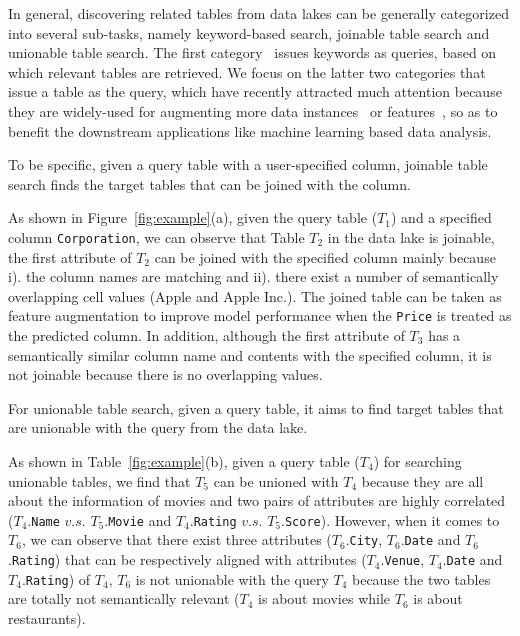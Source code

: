 In general, discovering related tables from data lakes can be generally categorized into several sub-tasks, namely keyword-based search, joinable table search and unionable table search.
The first category~\cite{} issues keywords as queries, based on which relevant tables are retrieved. 
We focus on the latter two categories that issue a table as the query, which have recently attracted much attention because they are widely-used for augmenting more data instances~\cite{} or features~\cite{}, so as to  benefit the downstream applications like machine learning based data analysis.
%


To be specific, given a query table with a user-specified column, joinable table search finds the target tables that can be joined with the column.

\begin{example}
	As shown in Figure~\ref{fig:example}(a), given the query table ($T_1$) and a specified column \texttt{Corporation},  
	we can observe that Table $T_2$ in the data lake is joinable, \ie the first attribute of $T_2$ can be joined with the specified column mainly because i). the column names are  matching  and 
	ii). there exist a number of semantically overlapping cell values (\eg Apple and Apple Inc.). 
	The joined table can be taken as feature augmentation to improve model performance when  the \texttt{Price} is treated as the predicted column. 
	In addition, although the first attribute of $T_3$ has a semantically similar column name and contents  with the specified column, it is not joinable because there is no overlapping values.
\end{example}

 For unionable table search, given a query table, it aims to find target tables that are unionable with the query from the data lake.                  
 
 \begin{example}
 	As shown in Table~\ref{fig:example}(b), given a query table ($T_4$)  for searching unionable tables, we find that  $T_5$ can be unioned with $T_4$ because they are all about the information of movies and  two pairs of attributes are highly correlated ($T_4$.\texttt{Name} $v.s.$ $T_5$.\texttt{Movie} and $T_4$.\texttt{Rating} $v.s.$ $T_5$.\texttt{Score}). 
 	However, when it comes to $T_6$, we can observe that there exist three attributes ($T_6$.\texttt{City}, $T_6$.\texttt{Date} and $T_6$.\texttt{Rating}) that can be respectively aligned with attributes ($T_4$.\texttt{Venue}, $T_4$.\texttt{Date} and $T_4$.\texttt{Rating}) of $T_4$,  $T_6$ is not unionable with the query $T_4$ because the two tables are totally not semantically relevant ($T_4$ is about movies while $T_6$ is about restaurants).
 \end{example}




